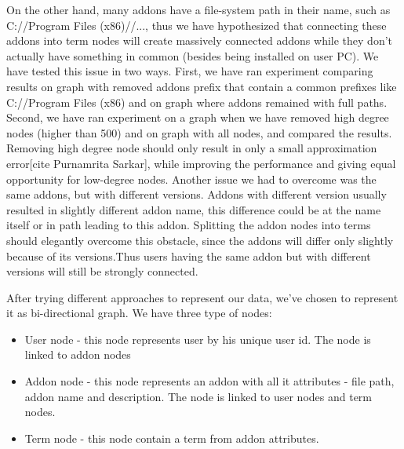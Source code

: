 \documentclass[11pt,oneside]{book}
\begin{document}
On the other hand, many addons have a file-system path in their name, such as C://Program Files (x86)//..., thus we have hypothesized that connecting these addons into term nodes will create massively connected addons while they don't actually have something in common (besides being installed on user PC). We have tested this issue in two ways. First, we have ran experiment comparing results on graph with removed addons prefix that contain a common prefixes like C://Program Files (x86) and on graph where addons remained with full paths. Second, we have ran experiment on a graph when we have removed high degree nodes (higher than 500) and on graph with all nodes, and compared the results. Removing high degree node should only result in only a small approximation error[cite Purnamrita Sarkar], while improving the performance and giving equal opportunity for low-degree nodes.
Another issue we had to overcome was the same addons, but with different versions. Addons with different version usually resulted in slightly different addon name, this difference could be at the name itself or in path leading to this addon. Splitting the addon nodes into terms should elegantly overcome this obstacle, since the addons will differ only slightly because of its versions.Thus users having the same addon but with different versions will still be strongly connected.

After trying different approaches to represent our data, we've chosen to represent it as bi-directional graph.
We have three type of nodes:
\begin{itemize}
\renewcommand{\labelitemi}{$\bullet$} 
\item User node - this node represents user by his unique user id. The node is linked to addon nodes
\item Addon node - this node represents an addon with all it attributes - file path, addon name and description. The node is linked to user nodes and term nodes.
\item Term node - this node contain a term from addon attributes.
\end{itemize}
\end{document}
